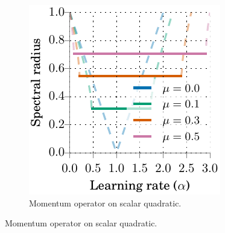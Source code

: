 \documentclass{article} %
\newcommand{\mat}[1]{\bm{\mathit{#1}}}
\begin{document}


\begin{figure}
\vspace{-2.95em}
\begin{minipage}{1.0\linewidth}
\begin{figure}[H]
  \includegraphics[width=0.975\linewidth]{figures/spectral_radii}
  \vspace{-0.75em}
\caption{
Momentum operator on scalar quadratic.
}
\label{fig:lr_robustness}
\end{figure}
\end{minipage}
\end{figure}
\vspace{-0.5em}
\end{document}
